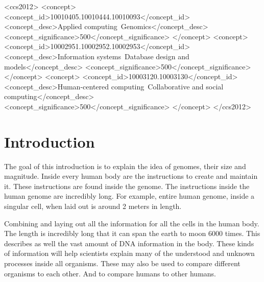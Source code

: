 \documentclass[acmsmall]{acmart}
\begin{document}
\begin{CCSXML}
<ccs2012>
   <concept>
       <concept_id>10010405.10010444.10010093</concept_id>
       <concept_desc>Applied computing~Genomics</concept_desc>
       <concept_significance>500</concept_significance>
       </concept>
   <concept>
       <concept_id>10002951.10002952.10002953</concept_id>
       <concept_desc>Information systems~Database design and models</concept_desc>
       <concept_significance>500</concept_significance>
       </concept>
   <concept>
       <concept_id>10003120.10003130</concept_id>
       <concept_desc>Human-centered computing~Collaborative and social computing</concept_desc>
       <concept_significance>500</concept_significance>
       </concept>
 </ccs2012>
\end{CCSXML}




\maketitle

\section{Introduction}
The goal of this introduction is to explain the idea of genomes, their size and magnitude. Inside every human body are the instructions to create and maintain it. These instructions are found inside the genome. The instructions inside the human genome are incredibly long. For example, entire human genome, inside a singular cell, when laid out is around 2 meters in length.\cite{ency_sci_tech}

Combining  and laying out all the information for all the cells in the human body. The length is incredibly long that it can span the earth to moon 6000 times. This describes as well the vast amount of DNA information in the body. These kinds of information will help scientists explain many of the understood and unknown processes inside all organisms. These may also be used to compare different organisms to each other. And to compare humans to other humans.
\end{document}
